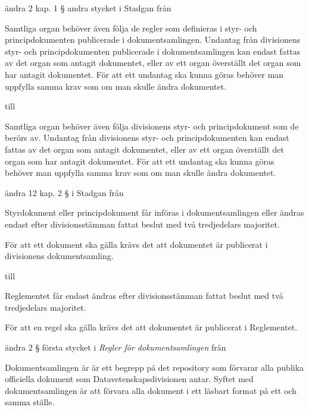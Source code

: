 \documentclass[protokoll]{dvd}
\begin{document}
\begin{attsatser}
	\item ändra 2 kap. 1 § andra stycket i Stadgan från

	\begin{displayquote}
		Samtliga organ behöver även följa de regler som definieras i styr- och principdokumenten publicerade i dokumentsamlingen.
		Undantag från divisionens styr- och principdokumenten publicerade i dokumentsamlingen kan endast fattas av det organ som antagit dokumentet, eller av ett organ överställt det organ som har antagit dokumentet.
		För att ett undantag ska kunna göras behöver man uppfylla samma krav som om man skulle ändra dokumentet.
	\end{displayquote}

	till

	\begin{displayquote}
		Samtliga organ behöver även följa divisionens styr- och principdokument som de berörs av.
		Undantag från divisionens styr- och principdokumenten kan endast fattas av det organ som antagit dokumentet, eller av ett organ överställt det organ som har antagit dokumentet.
		För att ett undantag ska kunna göras behöver man uppfylla samma krav som om man skulle ändra dokumentet.
	\end{displayquote}

	\item ändra 12 kap. 2 § i Stadgan från

	\begin{displayquote}
		Styrdokument eller principdokument får införas i dokumentsamlingen eller ändras endast efter divisionsstämman fattat beslut med två tredjedelars majoritet.

		För att ett dokument ska gälla krävs det att dokumentet är publicerat i divisionens dokumentsamling.
	\end{displayquote}

	till

	\begin{displayquote}
		Reglementet får endast ändras efter divisionsstämman fattat beslut med två tredjedelars majoritet.

		För att en regel ska gälla krävs det att dokumentet är publicerat i Reglementet.
	\end{displayquote}

	\item ändra 2 § första stycket i \emph{Regler för dokumentsamlingen} från

	\begin{displayquote}
		Dokumentsamlingen är är ett begrepp på det repository som förvarar alla publika officiella dokument som Datavetenskapsdivisionen antar.
		Syftet med dokumentsamlingen är att förvara alla dokument i ett läsbart format på ett och samma ställe.
	\end{displayquote}


\end{attsatser}
\end{document}
